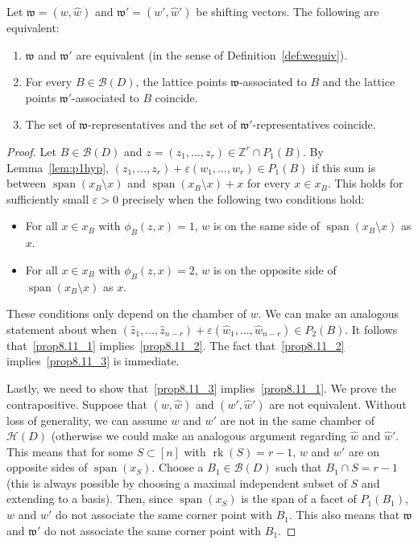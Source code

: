 \documentclass[ALCO,ThmDefs,Unicode,epreuves]{cedram}
\renewcommand{\epsilon}{\varepsilon}
\newcommand{\Z}{\mathbb{Z}}
\newcommand{\B}{\mathcal{B}}
\newcommand{\what}{\widehat}
\newcommand{\CB}{x_B}
\newcommand{\w}{\mathfrak w}
\DeclareMathOperator{\rk}{rk}
\DeclareMathOperator{\spn}{span}
\begin{document}
\begin{prop}\label{prop:tfaeshifthyp}
Let $\w = (w,\widehat w)$ and $\w' = (w',\widehat w')$ be shifting vectors. The following are equivalent:
\begin{enumerate}
 \item\label{prop8.11_1} $\w$ and $\w'$ are equivalent (in the sense of Definition~\ref{def:wequiv}).
 \item\label{prop8.11_2} For every $B \in \B(D)$, the lattice points $\w$-associated to $B$ and the lattice points $\w'$-associated to $B$ coincide.
 \item\label{prop8.11_3} The set of $\w$-representatives and the set of $\w'$-representatives coincide.
\end{enumerate}
\end{prop}
\begin{proof}
Let $B \in \B(D)$ and $z= (z_1,\dots, z_r) \in \Z^r \cap P_1(B)$. By Lemma~\ref{lem:p1hyp}, $(z_1,\dots, z_r) + \epsilon (w_1,\dots, w_r) \in P_1(B)$ if this sum is between $\spn(\CB \setminus x)$ and $\spn(\CB \setminus x) + x$ for every $x \in \CB$. This holds for sufficiently small $\epsilon>0$ precisely when the following two conditions hold:
\begin{itemize}
 \item For all $x \in \CB$ with $\phi_B(z,x) = 1$, $w$ is on the same side of $\spn(\CB\setminus x)$ as $x$. 
 \item For all $x \in \CB$ with $\phi_B(z,x) = 2$, $w$ is on the opposite side of $\spn(\CB\setminus x)$ as $x$. 
\end{itemize}
These conditions only depend on the chamber of $w$. We can make an analogous statement about when $(\widehat z_1,\dots, \widehat z_{n-r}) + \epsilon (\widehat w_1,\dots, \widehat w_{n-r}) \in P_2(B)$. It follows that~\eqref{prop8.11_1} implies~\eqref{prop8.11_2}. The fact that~\eqref{prop8.11_2} implies~\eqref{prop8.11_3} is immediate. 

Lastly, we need to show that~\eqref{prop8.11_3} implies~\eqref{prop8.11_1}. We prove the contrapositive. Suppose that $(w,\widehat w)$ and $(w',\widehat w')$ are not equivalent. Without loss of generality, we can assume $w$ and $w'$ are not in the same chamber of $\mathcal H(D)$ (otherwise we could make an analogous argument regarding $\what w$ and $\what w'$. This means that for some $S \subset [n]$ with $\rk(S) = r-1$, $w$ and $w'$ are on opposite sides of $\spn(x_S)$. Choose a $B_1 \in \B(D)$ such that $B_1 \cap S = r-1$ (this is always possible by choosing a maximal independent subset of $S$ and extending to a basis). Then, since $\spn(x_S)$ is the span of a facet of $P_1(B_1)$, $w$ and $w'$ do not associate the same corner point with $B_1$. This also means that $\w$ and $\w'$ do not associate the same corner point with $B_1$. 


\end{proof}
\end{document}

